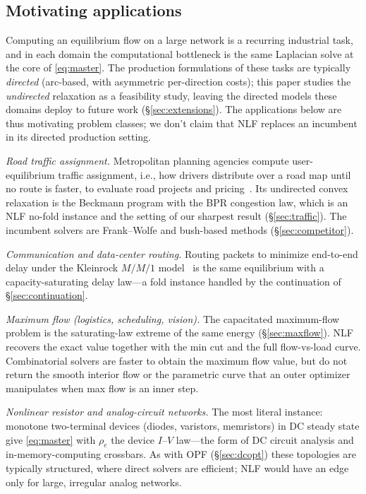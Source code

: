 \documentclass{siamart220329}
\begin{document}
\subsection{Motivating applications}\label{sec:applications}
Computing an equilibrium flow on a large network is a recurring industrial task, and in each domain
the computational bottleneck is the same Laplacian solve at the core of \eqref{eq:master}.
The production formulations of these tasks are typically \emph{directed} (arc-based, with asymmetric
per-direction costs); this paper studies the \emph{undirected} relaxation as a feasibility study,
leaving the directed models these domains deploy to future work (\S\ref{sec:extensions}). The
applications below are thus motivating problem classes; we don't claim that NLF replaces an
incumbent in its directed production setting.

\emph{Road traffic assignment.} Metropolitan planning agencies compute user-equilibrium traffic
assignment, i.e., how drivers distribute over a road map until no route is faster, to evaluate road
projects and pricing~\cite{beckmann,bpr,boyles-tna}. Its undirected convex relaxation is the
Beckmann program with the BPR congestion law, which is an NLF no-fold instance and the setting of our
sharpest result (\S\ref{sec:traffic}). The incumbent solvers are Frank--Wolfe and bush-based methods
(\S\ref{sec:competitor}).

\emph{Communication and data-center routing.} Routing packets to minimize end-to-end
delay under the Kleinrock $M/M/1$ model~\cite{bertsekas-gallager,mendiola-te} is the same equilibrium
with a capacity-saturating delay law---a fold instance handled by the continuation of
\S\ref{sec:continuation}.

\emph{Maximum flow (logistics, scheduling, vision).} The capacitated maximum-flow problem
\cite{ahuja-magnanti-orlin,goldberg-tarjan} is the saturating-law extreme of the same energy
(\S\ref{sec:maxflow}). NLF recovers the exact value together with the min cut and the full
flow-vs-load curve. Combinatorial solvers are faster to obtain the maximum flow value, but do not return the smooth
interior flow or the parametric curve that an outer optimizer manipulates when max flow is an inner
step.

\emph{Nonlinear resistor and analog-circuit networks.} The most literal instance: monotone
two-terminal devices (diodes, varistors, memristors) in DC steady state give \eqref{eq:master} with
$\rho_e$ the device $I$--$V$ law---the form of DC circuit analysis and in-memory-computing crossbars.
As with OPF (\S\ref{sec:dcopt}) these topologies are typically structured, where direct solvers are efficient; NLF would have an edge only for large, irregular analog networks.
\end{document}
